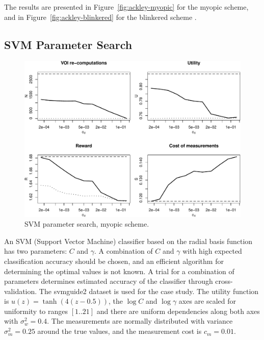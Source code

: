The results are presented in Figure~\ref{fig:ackley-myopic} for the
myopic scheme, and in Figure~\ref{fig:ackley-blinkered} for the
blinkered scheme \cite{TolpinShimony.blinkered}.

\subsection{SVM Parameter Search}
\label{sec:raticomp-svm}

\begin{figure}[h]
\centering
\includegraphics[scale=0.63]{svmguide2-myopic.pdf}
\caption{SVM parameter search, myopic scheme.}
\label{fig:svmguide2-myopic}
\end{figure}
An SVM (Support Vector Machine) classifier based on the radial basis
function has two parameters: $C$ and $\gamma$.  A combination of $C$
and $\gamma$ with high expected classification accuracy should be
chosen, and an efficient algorithm for determining the optimal values
is not known. A trial for a combination of parameters determines
estimated accuracy of the classifier through cross-validation. The
{\sc svmguide2} \cite{Hsu.dataset} dataset is used for the case study.
The utility function is $u(z)=\tanh(4(z-0.5))$, the $\log C$ and $\log
\gamma$ axes are scaled for uniformity to ranges $[1..21]$ and there
are uniform dependencies along both axes with $\sigma_w^2=0.4$. The
measurements are normally distributed with variance $\sigma_m^2=0.25$
around the true values, and the measurement cost is $c_m=0.01$.
